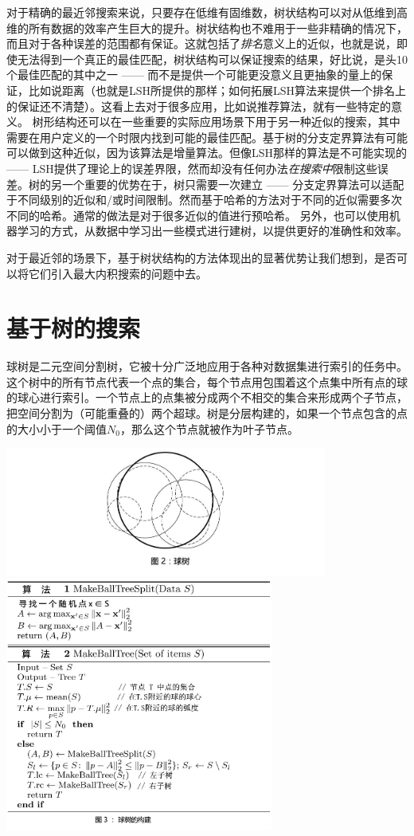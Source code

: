 \documentclass[twocolumn]{article}
\begin{document}
对于精确的最近邻搜索来说，只要存在低维有固维数\cite{4,10}，树状结构可以对从低维到高维的所有数据的效率产生巨大的提升。树状结构也不难用于一些非精确的情况下，而且对于各种误差的范围都有保证。这就包括了\emph{排名}意义上的近似，也就是说，即使无法得到一个真正的最佳匹配，树状结构可以保证搜索的结果，好比说，是头10个最佳匹配的其中之一\cite{32} —— 而不是提供一个可能更没意义且更抽象的量上的保证，比如说距离（也就是LSH所提供的那样；如何拓展LSH算法来提供一个排名上的保证还不清楚）。这看上去对于很多应用，比如说推荐算法，就有一些特定的意义。
树形结构还可以在一些重要的实际应用场景下用于另一种近似的搜索，其中需要在用户定义的一个时限内找到可能的最佳匹配。基于树的分支定界算法有可能可以做到这种近似，因为该算法是增量算法。但像LSH那样的算法是不可能实现的 —— LSH提供了理论上的误差界限，然而却没有任何办法\emph{在搜索中}限制这些误差。树的另一个重要的优势在于，树只需要一次建立 —— 分支定界算法可以适配于不同级别的近似和/或时间限制。然而基于哈希的方法对于不同的近似需要多次不同的哈希。通常的做法是对于很多近似的值进行预哈希。
另外，也可以使用机器学习的方式，从数据中学习出一些模式进行建树\cite{6,25}，以提供更好的准确性和效率。

对于最近邻的场景下，基于树状结构的方法体现出的显著优势让我们想到，是否可以将它们引入最大内积搜索的问题中去。

\section{基于树的搜索}

球树\cite{29, 28}是二元空间分割树，它被十分广泛地应用于各种对数据集进行索引的任务中。这个树中的所有节点代表一个点的集合，每个节点用包围着这个点集中所有点的球的球心进行索引。一个节点上的点集被分成两个不相交的集合来形成两个子节点，把空间分割为（可能重叠的）两个超球。树是分层构建的，如果一个节点包含的点的大小小于一个阈值$N_0$，那么这个节点就被作为叶子节点。

\includegraphics[width=300pt,clip,trim=50 0 0 0]{fig02.jpg}
\includegraphics[width=250pt,clip,trim=0 0 0 -30]{fig03.jpg}
\end{document}
